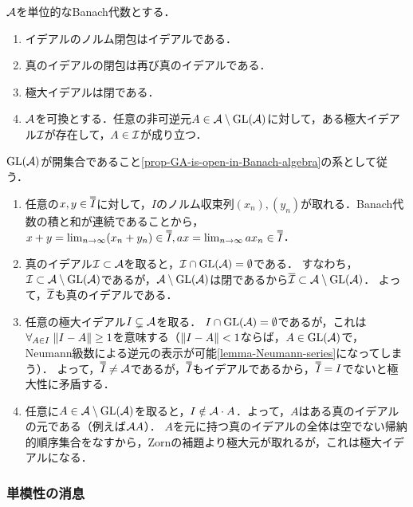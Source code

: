 \documentclass[uplatex,dvipdfmx]{jsreport}
\begin{document}
\begin{corollary}[Banach代数の極大イデアルは閉]\label{cor-maximal-ideal-is-closed}
    $\mathcal{A}$を単位的なBanach代数とする．
    \begin{enumerate}
        \item イデアルのノルム閉包はイデアルである．
        \item 真のイデアルの閉包は再び真のイデアルである．
        \item 極大イデアルは閉である．
        \item $\mathcal{A}$を可換とする．任意の非可逆元$A\in\mathcal{A}\setminus\mathrm{GL}(\mathcal{A})$に対して，ある極大イデアル$\mathcal{I}$が存在して，$A\in\mathcal{I}$が成り立つ．
    \end{enumerate}
\end{corollary}
\begin{Proof}
    $\mathrm{GL}(\mathcal{A})$が開集合であること\ref{prop-GA-is-open-in-Banach-algebra}の系として従う．
    \begin{enumerate}
        \item 任意の$x,y\in\oo{I}$に対して，$I$のノルム収束列$(x_n),(y_n)$が取れる．Banach代数の積と和が連続であることから，$x+y=\lim_{n\to\infty}(x_n+y_n)\in\oo{I},ax=\lim_{n\to\infty}ax_n\in\oo{I}$．
        \item 真のイデアル$\mathcal{I}\subset\mathcal{A}$を取ると，$\mathcal{I}\cap\mathrm{GL}(\mathcal{A})=\emptyset$である．
        すなわち，$\mathcal{I}\subset\mathcal{A}\setminus\mathrm{GL}(\mathcal{A})$であるが，$\mathcal{A}\setminus\mathrm{GL}(\mathcal{A})$は閉であるから$\overline{\mathcal{I}}\subset\mathcal{A}\setminus\mathrm{GL}(\mathcal{A})$．
        よって，$\overline{\mathcal{I}}$も真のイデアルである．
        \item 任意の極大イデアル$I\subsetneq\mathcal{A}$を取る．
        $I\cap\mathrm{GL}(\mathcal{A})=\emptyset$であるが，これは$\forall_{A\in I}\;\|I-A\|\ge 1$を意味する（$\|I-A\|<1$ならば，$A\in\mathrm{GL}(\mathcal{A})$で，Neumann級数による逆元の表示が可能\ref{lemma-Neumann-series}になってしまう）．
        よって，$\oo{I}\ne\A$であるが，$\oo{I}$もイデアルであるから，$\oo{I}=I$でないと極大性に矛盾する．
        \item 任意に$A\in\mathcal{A}\setminus\mathrm{GL}(\mathcal{A})$を取ると，$I\notin\mathcal{A}\cdot A$．よって，$A$はある真のイデアルの元である（例えば$\mathcal{A} A$）．
        $A$を元に持つ真のイデアルの全体は空でない帰納的順序集合をなすから，Zornの補題より極大元が取れるが，これは極大イデアルになる．
    \end{enumerate}
\end{Proof}

\subsubsection{単模性の消息}
\end{document}
